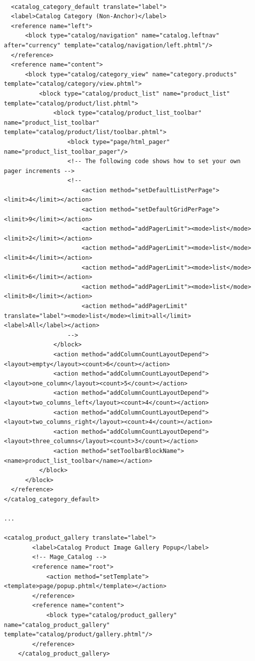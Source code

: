\vspace{0.5cm}
\lstset{language=XML}
\begin{lstlisting} 

  <catalog_category_default translate="label">
  <label>Catalog Category (Non-Anchor)</label>
  <reference name="left">
      <block type="catalog/navigation" name="catalog.leftnav" after="currency" template="catalog/navigation/left.phtml"/>
  </reference>
  <reference name="content">
      <block type="catalog/category_view" name="category.products" template="catalog/category/view.phtml">
          <block type="catalog/product_list" name="product_list" template="catalog/product/list.phtml">
              <block type="catalog/product_list_toolbar" name="product_list_toolbar" template="catalog/product/list/toolbar.phtml">
                  <block type="page/html_pager" name="product_list_toolbar_pager"/>
                  <!-- The following code shows how to set your own pager increments -->
                  <!--
                      <action method="setDefaultListPerPage"><limit>4</limit></action>
                      <action method="setDefaultGridPerPage"><limit>9</limit></action>
                      <action method="addPagerLimit"><mode>list</mode><limit>2</limit></action>
                      <action method="addPagerLimit"><mode>list</mode><limit>4</limit></action>
                      <action method="addPagerLimit"><mode>list</mode><limit>6</limit></action>
                      <action method="addPagerLimit"><mode>list</mode><limit>8</limit></action>
                      <action method="addPagerLimit" translate="label"><mode>list</mode><limit>all</limit><label>All</label></action>
                  -->
              </block>
              <action method="addColumnCountLayoutDepend"><layout>empty</layout><count>6</count></action>
              <action method="addColumnCountLayoutDepend"><layout>one_column</layout><count>5</count></action>
              <action method="addColumnCountLayoutDepend"><layout>two_columns_left</layout><count>4</count></action>
              <action method="addColumnCountLayoutDepend"><layout>two_columns_right</layout><count>4</count></action>
              <action method="addColumnCountLayoutDepend"><layout>three_columns</layout><count>3</count></action>
              <action method="setToolbarBlockName"><name>product_list_toolbar</name></action>
          </block>
      </block>
  </reference>
</catalog_category_default>

...

<catalog_product_gallery translate="label">
        <label>Catalog Product Image Gallery Popup</label>
        <!-- Mage_Catalog -->
        <reference name="root">
            <action method="setTemplate"><template>page/popup.phtml</template></action>
        </reference>
        <reference name="content">
            <block type="catalog/product_gallery" name="catalog_product_gallery" template="catalog/product/gallery.phtml"/>
        </reference>
    </catalog_product_gallery>


\end{lstlisting}
\vspace{0.5cm}

